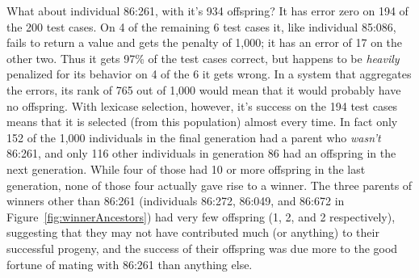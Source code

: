 What about individual 86:261, with it's 934 offspring? It has error zero on 194 of the 200
test cases. On 4 of the remaining 6 test cases it,
like individual 85:086, fails to return a value and gets the penalty of 1,000; it has an error of 17 on
the other two. Thus it gets 97\% of the test cases correct, but happens to be \emph{heavily} penalized
for its behavior on 4 of the 6 it gets wrong. In a system that aggregates the errors, its rank of 765
out of 1,000 would mean that it would probably have no offspring. With lexicase selection, however,
it's success on the 194 test cases means that it is selected (from this population) almost every time.
In fact only 152 of the 1,000 individuals in the final generation had a parent who \emph{wasn't}
86:261, and only 116 other individuals in generation 86 had an offspring in the next generation. While
four of those had 10 or more offspring in the last generation, none of those four actually
gave rise to a winner. The three parents of winners other than 86:261 (individuals 86:272, 86:049, 
and 86:672 in Figure~\ref{fig:winnerAncestors}) had very few offspring (1, 2, and 2 respectively),
suggesting that they may not have contributed much (or anything) to their successful progeny, and 
the success of their offspring was due more to the good fortune of mating with 86:261 than anything else.

